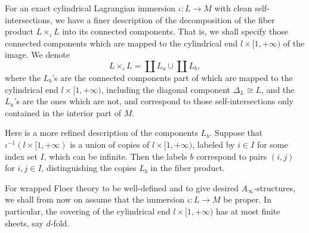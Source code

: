 \documentclass{amsart}
\numberwithin{equation}{section}
\numberwithin{figure}{section}
\begin{document}
	For an exact cylindrical Lagrangian immersion $\iota: L \to M$ with clean self-intersections, we have a finer description of the decomposition of the fiber product $L \times_{\iota} L$ into its connected components. That is, we shall specify those connected components which are mapped to the cylindrical end $l \times [1, +\infty)$ of the image. We denote
\begin{equation}
L \times_{\iota} L = \coprod L_{a} \cup \coprod L_{b},
\end{equation}
where the $L_{b}$'s are the connected components part of which are mapped to the cylindrical end $l \times [1, +\infty)$, including the diagonal component $\Delta_{L} \cong L$, and the $L_{a}$'s are the ones which are not, and correspond to those self-intersections only contained in the interior part of $M$. \par
	Here is a more refined description of the components $L_{b}$. Suppose that $\iota^{-1}(l \times [1, +\infty)$ is a union of copies of $l \times [1, +\infty)$, labeled by $i \in I$ for some index set $I$, which can be infinite. Then the labels $b$ correspond to pairs $(i, j)$ for $i, j \in I$, distinguishing the copies $L_{b}$ in the fiber product. \par
	For wrapped Floer theory to be well-defined and to give desired $A_{\infty}$-structures, we shall from now on assume that the immersion $\iota: L \to M$ be proper. In particular, the covering of the cylindrical end $l \times [1, +\infty)$ has at most finite sheets, say $d$-fold. \par
\end{document}
